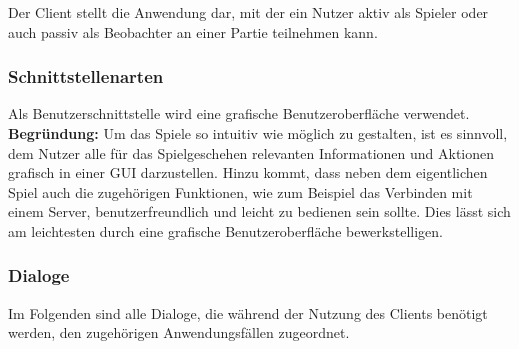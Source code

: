 Der Client stellt die Anwendung dar, mit der ein Nutzer aktiv als Spieler oder auch passiv als Beobachter an einer Partie teilnehmen kann.

\subsubsection{Schnittstellenarten}
Als Benutzerschnittstelle wird eine grafische Benutzeroberfläche verwendet. \\ \textbf{Begründung:} Um das Spiele so intuitiv wie möglich zu gestalten, ist es sinnvoll, dem Nutzer alle für das Spielgeschehen relevanten Informationen und Aktionen grafisch in einer GUI darzustellen. Hinzu kommt, dass neben dem eigentlichen Spiel auch die zugehörigen Funktionen, wie zum Beispiel das Verbinden mit einem Server, benutzerfreundlich und leicht zu bedienen sein sollte. Dies lässt sich am leichtesten durch eine grafische Benutzeroberfläche bewerkstelligen.

\newpage

\subsubsection{Dialoge}
Im Folgenden sind alle Dialoge, die während der Nutzung des Clients benötigt werden, den zugehörigen Anwendungsfällen zugeordnet. 

